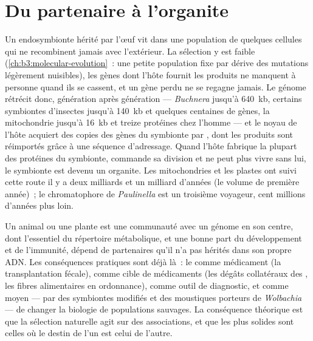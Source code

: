\section{Du partenaire à l'organite}

\begin{proposition}\label{prop:b3:microbiomes:reduction}
Un endosymbionte hérité par l'œuf vit dans une population de quelques
cellules qui ne recombinent jamais avec l'extérieur. La sélection y est
faible (\cref{ch:b3:molecular-evolution}~: une petite population fixe
par dérive des mutations légèrement nuisibles), les gènes dont l'hôte
fournit les produits ne manquent à personne quand ils se cassent, et un
gène perdu ne se regagne jamais. Le génome rétrécit donc, génération
après génération --- \emph{Buchnera} jusqu'à \qty{640}{kb}, certains
symbiontes d'insectes jusqu'à \qty{140}{kb} et quelques centaines de
gènes, la mitochondrie jusqu'à \qty{16}{kb} et treize protéines chez
l'homme --- et le noyau de l'hôte acquiert des copies des gènes du
symbionte par \emph{}, dont les
produits sont réimportés grâce à une séquence d'adressage. Quand l'hôte
fabrique la plupart des protéines du symbionte, commande sa division et
ne peut plus vivre sans lui, le symbionte est devenu un organite. Les
mitochondries et les plastes ont suivi cette route il y a deux
milliards et un milliard d'années (le volume de première année)~; le
chromatophore de \emph{Paulinella} est un troisième voyageur, cent
millions d'années plus loin.
\end{proposition}

\begin{remark}\label{rem:b3:microbiomes:individual}
Un animal ou une plante est une communauté avec un génome en son
centre, dont l'essentiel du répertoire métabolique, et une bonne part
du développement et de l'immunité, dépend de partenaires qu'il n'a pas
hérités dans son propre ADN. Les conséquences pratiques sont déjà là~:
le  comme médicament (la transplantation fécale), comme cible
de médicaments (les dégâts collatéraux des , les fibres
alimentaires en ordonnance), comme outil de diagnostic, et comme
moyen --- par des symbiontes modifiés et des moustiques porteurs de
\emph{Wolbachia} --- de changer la biologie de populations sauvages. La
conséquence théorique est que la sélection naturelle agit sur des
associations, et que les plus solides sont celles où le destin de l'un
est celui de l'autre.
\end{remark}

